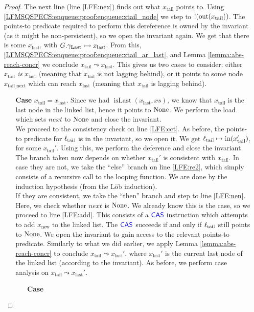 \documentclass[a4paper, 10pt]{report}
\theoremstyle{definition}
\newcommand{\xsc}{xs}
\newcommand{\isLast}{\operatorname{isLast}}
\newcommand{\locN}[1]{\loc_{\mathrm{#1}}}
\newcommand{\loctail}{\locN{tail}}
\newcommand{\nIn}[1]{\operatorname{in}(#1)}
\newcommand{\nOut}[1]{\operatorname{out}(#1)}
\newcommand{\node}{x}
\newcommand{\nodeN}[1]{\node_{\mathrm{#1}}}
\newcommand{\nodetail}{\nodeN{tail}}
\newcommand{\nodelast}{\nodeN{last}}
\newcommand{\nodenew}{\nodeN{new}}
\newcommand{\nodetailnext}{\nodeN{tail\_next}}
\newcommand{\Qg}{G}
\newcommand{\glast}{\gname_{\mathrm{Last}}}
\newcommand{\reach}[2]{#1 \leadsto #2}
\newcommand{\ap}[2]{#1 \rightarrowtail #2}
\begin{document}
\begin{proof}
  The next line (line \ref{LFE:nex}) finds out what $\nodetail$ points to. Using \ref{LFMSQSPECS:enqueue:proof:enqueue:xtail_node} we step to $\deref (\nOut{\nodetail})$. The points-to predicate required to perform this dereference is owned by the invariant (as it might be non-persistent), so we open the invariant again. We get that there is some $\nodelast$, with $\ap{\Qg.\glast}{\nodelast}$. From this, \ref{LFMSQSPECS:enqueue:proof:enqueue:xtail_ar_last}, and Lemma \ref{lemma:abs-reach-concr} we conclude $\reach{\nodetail}{\nodelast}$. This gives us two cases to consider: either $\nodetail$ \textit{is} $\nodelast$ (meaning that $\nodetail$ is not lagging behind), or it points to some node $\nodetailnext$ which can reach $\nodelast$ (meaning that $\nodetail$ is lagging behind).
  \begin{itemize}
    \item[\textbf{Case}]
    $\nodetail = \nodelast$. Since we had $\isLast(\nodelast, \xsc)$, we know that $\nodetail$ is the last node in the linked list, hence it points to $\operatorname{None}$. We perform the load which sets $next$ to $\operatorname{None}$ and close the invariant.\\
    We proceed to the consistency check on line \ref{LFE:cct}. As before, the points-to predicate for $\loctail$ is in the invariant, so we open it. We get $\loctail \mapsto \nIn{\nodetail'}$, for some $\nodetail'$. Using this, we perform the deference and close the invariant. The branch taken now depends on whether $\nodetail'$ is consistent with $\nodetail$. In case they are not, we take the ``else'' branch on line \ref{LFE:re2}, which simply consists of a recursive call to the looping function. We are done by the induction hypothesis (from the Löb induction).\\
    If they are consistent, we take the ``then'' branch and step to line \ref{LFE:nen}. Here, we check whether $next$ is $\operatorname{None}$. We already know this is the case, so we proceed to line \ref{LFE:add}. This consists of a $\textsf{\color{blue} CAS}$ instruction which attempts to add $\nodenew$ to the linked list. The $\textsf{\color{blue} CAS}$ succeeds if and only if $\loctail$ still points to $\operatorname{None}$. We open the invariant to gain access to the relevant points-to predicate. Similarly to what we did earlier, we apply Lemma \ref{lemma:abs-reach-concr} to conclude $\reach{\nodetail}{\nodelast'}$, where $\nodelast'$ is the current last node of the linked list (according to the invariant). As before, we perform case analysis on $\reach{\nodetail}{\nodelast'}$.
    \begin{itemize}
      \item[\textbf{Case}]

\end{itemize}
\end{itemize}
\end{proof}
\end{document}
